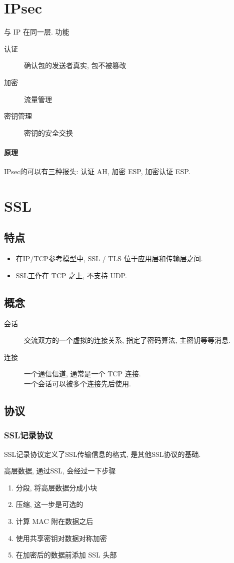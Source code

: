 \documentclass{ctexart}
\begin{document}
\section{IPsec}
    与 IP 在同一层. 功能 \begin{description}
        \item[认证] 确认包的发送者真实, 包不被篡改
        \item[加密] 流量管理
        \item[密钥管理] 密钥的安全交换
    \end{description}
\paragraph{原理} IPsec的可以有三种报头: 认证 AH, 加密 ESP, 加密认证 ESP.

\section{SSL}
\subsection{特点}
    \begin{itemize}
        \item 在IP/TCP参考模型中, SSL / TLS 位于应用层和传输层之间.
        \item SSL工作在 TCP 之上, 不支持 UDP.
    \end{itemize}
\subsection{概念}
    \begin{description}
        \item[会话] 交流双方的一个虚拟的连接关系, 指定了密码算法, 主密钥等等消息.
        \item[连接] 一个通信信道, 通常是一个 TCP 连接.\\
            一个会话可以被多个连接先后使用.
    \end{description}
\subsection{协议}
\subsubsection{SSL记录协议} SSL记录协议定义了SSL传输信息的格式, 是其他SSL协议的基础.\par
    高层数据, 通过SSL, 会经过一下步骤 \begin{enumerate}
        \item 分段, 将高层数据分成小块
        \item 压缩, 这一步是可选的
        \item 计算 MAC 附在数据之后
        \item 使用共享密钥对数据对称加密
        \item 在加密后的数据前添加 SSL 头部
    \end{enumerate}
\end{document}
